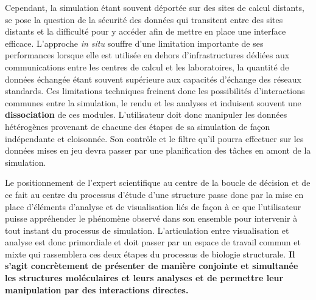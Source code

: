 Cependant, la simulation étant souvent déportée sur des sites de calcul distants, se pose la question de la sécurité des données qui transitent entre des sites distants et la difficulté pour y accéder afin de mettre en place une interface efficace. L'approche \textit{in situ} souffre d'une limitation importante de ses performances lorsque elle est utilisée en dehors d'infrastructures dédiées aux communications entre les centres de calcul et les laboratoires, la quantité de données échangée étant souvent supérieure aux capacités d'échange des réseaux standards. Ces limitations techniques freinent donc les possibilités d'interactions communes entre la simulation, le rendu et les analyses et induisent souvent une \textbf{dissociation} de ces modules. L'utilisateur doit donc manipuler les données hétérogènes provenant de chacune des étapes de sa simulation de façon indépendante et cloisonnée. Son contrôle et le filtre qu'il pourra effectuer sur les données mises en jeu devra passer par une planification des tâches en amont de la simulation.

Le positionnement de l'expert scientifique au centre de la boucle de décision et de ce fait au centre du processus d'étude d'une structure passe donc par la mise en place d'éléments d'analyse et de visualisation liés de façon à ce que l'utilisateur puisse appréhender le phénomène observé dans son ensemble pour intervenir à tout instant du processus de simulation. 
L'articulation entre visualisation et analyse est donc primordiale et doit passer par un espace de travail commun et mixte qui rassemblera ces deux étapes du processus de biologie structurale. \textbf{Il s’agit concrètement de présenter de manière conjointe et simultanée les structures moléculaires et leurs analyses et de permettre leur manipulation par des interactions directes.}

